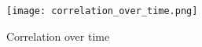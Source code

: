 
 \begin{figure}[H]
\centering
\texttt{[image: correlation\_over\_time.png]}
\caption{Correlation over time}
\label{correlation_over_time.png}
\end{figure}




